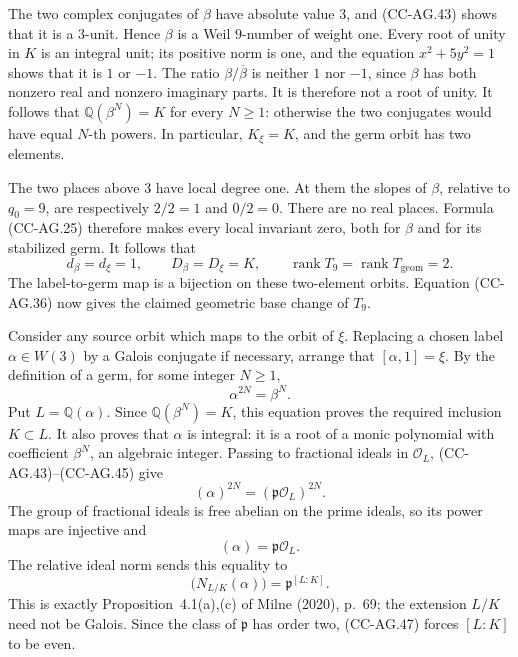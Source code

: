 The two complex conjugates of \(\beta\) have absolute
value \(3\), and (CC-AG.43) shows that it is a \(3\)-unit.
Hence \(\beta\) is a Weil \(9\)-number of weight one.
Every root of unity in \(K\) is an integral unit; its
positive norm is one, and the equation
\(x^2+5y^2=1\) shows that it is \(1\) or \(-1\).
The ratio \(\beta/\overline\beta\) is neither \(1\)
nor \(-1\), since \(\beta\) has both nonzero real and
nonzero imaginary parts.  It is therefore not a root
of unity.  It follows that
\(\mathbb Q(\beta^N)=K\) for every \(N\ge1\):
otherwise the two conjugates would have equal
\(N\)-th powers.  In particular, \(K_\xi=K\), and the
germ orbit has two elements.

The two places above \(3\) have local degree one.
At them the slopes of \(\beta\), relative to \(q_0=9\),
are respectively \(2/2=1\) and \(0/2=0\).
There are no real places.  Formula (CC-AG.25) therefore
makes every local invariant zero, both for \(\beta\)
and for its stabilized germ.  It follows that
\[
       d_\beta=d_\xi=1,\qquad
       D_\beta=D_\xi=K,\qquad
       \operatorname{rank}T_9
         =\operatorname{rank}T_{\mathrm{geom}}=2.
                                                               \tag{CC-AG.44}
\]
The label-to-germ map is a bijection on these two-element
orbits.  Equation (CC-AG.36) now gives the claimed
geometric base change of \(T_9\).

Consider any source orbit which maps to the orbit of
\(\xi\).  Replacing a chosen label \(\alpha\in W(3)\)
by a Galois conjugate if necessary, arrange that
\([\alpha,1]=\xi\).  By the definition of a germ,
for some integer \(N\ge1\),
\[
                            \alpha^{2N}=\beta^N.             \tag{CC-AG.45}
\]
Put \(L=\mathbb Q(\alpha)\).
Since \(\mathbb Q(\beta^N)=K\), this equation proves
the required inclusion \(K\subset L\).
It also proves that \(\alpha\) is integral: it is a
root of a monic polynomial with coefficient
\(\beta^N\), an algebraic integer.
Passing to fractional ideals in \(\mathcal O_L\),
(CC-AG.43)--(CC-AG.45) give
\[
                      (\alpha)^{2N}
                           =(\mathfrak p\mathcal O_L)^{2N}.
\]
The group of fractional ideals is free abelian on the
prime ideals, so its power maps are injective and
\[
                            (\alpha)=\mathfrak p\mathcal O_L.
                                                               \tag{CC-AG.46}
\]
The relative ideal norm sends this equality to
\[
             \bigl(N_{L/K}(\alpha)\bigr)
                        =\mathfrak p^{[L:K]}.                 \tag{CC-AG.47}
\]
This is exactly Proposition~4.1(a),(c) of Milne (2020),
p.~69; the extension \(L/K\) need not be Galois.
Since the class of \(\mathfrak p\) has order two,
(CC-AG.47) forces \([L:K]\) to be even.

